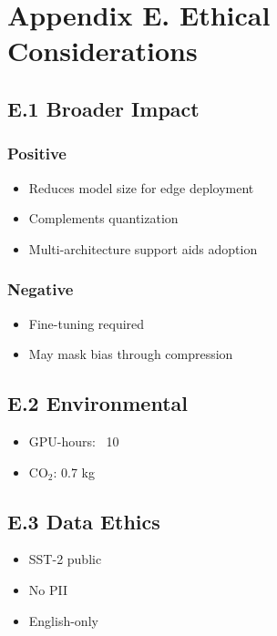 \section{Appendix E. Ethical Considerations}

\subsection{E.1 Broader Impact}

\subsubsection{Positive}
\begin{itemize}
\item Reduces model size for edge deployment
\item Complements quantization
\item Multi-architecture support aids adoption

\end{itemize}
\subsubsection{Negative}
\begin{itemize}
\item Fine-tuning required
\item May mask bias through compression

\end{itemize}
\subsection{E.2 Environmental}

\begin{itemize}
\item GPU-hours: ~10
\item CO$_2$: 0.7 kg

\end{itemize}
\subsection{E.3 Data Ethics}

\begin{itemize}
\item SST-2 public
\item No PII
\item English-only

\end{itemize}
